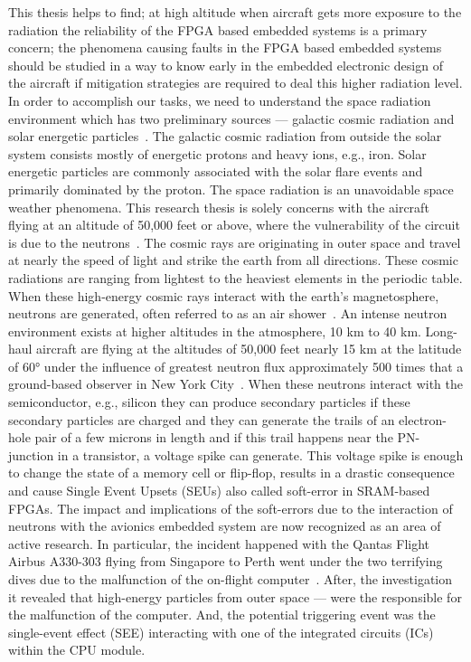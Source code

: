 This thesis helps to find; at high altitude when aircraft gets more exposure to the radiation the reliability of the FPGA based embedded systems is a primary concern; the phenomena causing faults in the FPGA based embedded systems should be studied in a way to know early in the embedded electronic design of the aircraft if mitigation strategies are required to deal this higher radiation level. 
In order to accomplish our tasks, we need to understand the space radiation environment which has two preliminary sources --- galactic cosmic radiation and solar energetic particles~\cite{SWE20216}. The galactic cosmic radiation from outside the solar system consists mostly of energetic protons and heavy ions, e.g., iron. Solar energetic particles are commonly associated with the solar flare events and primarily dominated by the proton.  The space radiation is an unavoidable space weather phenomena. This research thesis is solely concerns with the aircraft flying at an altitude of 50,000 feet or above, where the vulnerability of the circuit is due to the neutrons~\cite{xilinnseu}. The cosmic rays are originating in outer space and travel at nearly the speed of light and strike the earth from all directions. These cosmic radiations are ranging from lightest to the heaviest elements in the periodic table. When these high-energy cosmic rays interact with the earth's magnetosphere, neutrons are generated, often referred to as an air shower~\cite{lesea2005rosetta}.  An intense neutron environment exists at higher altitudes in the atmosphere, 10 km to 40 km.  Long-haul aircraft are flying at the altitudes of 50,000 feet nearly 15 km at the latitude of \ang{60} under the influence of greatest neutron flux approximately 500 times that a ground-based observer in New York City~\cite{lesea2005rosetta}. When these neutrons interact with the semiconductor, e.g., silicon they can produce secondary particles if these secondary particles are charged and they can generate the trails of an electron-hole pair of a few microns in length and if this trail happens near the PN-junction in a transistor, a voltage spike can generate. This voltage spike is enough to change the state of a memory cell or flip-flop, results in a drastic consequence and cause Single Event Upsets (SEUs) also called soft-error in SRAM-based FPGAs. The impact and implications of the soft-errors due to the interaction of neutrons with the avionics embedded system are now recognized as an area of active research. In particular, the incident happened with the Qantas Flight Airbus A330-303 flying from Singapore to Perth went under the two terrifying dives due to the malfunction of the on-flight computer~\citep{SWE20216}. After, the investigation it revealed that high-energy particles from outer space --- were the responsible for the malfunction of the computer. And, the potential triggering event was the single-event effect (SEE) interacting with one of the integrated circuits (ICs) within the CPU module. 



